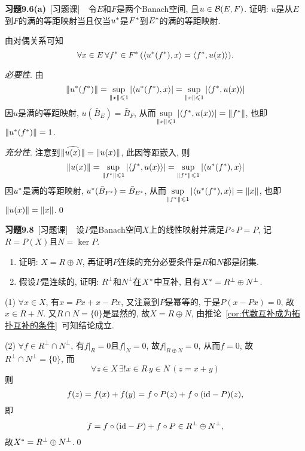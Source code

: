     \textbf{习题9.6(a)}\ [习题课]\ \ 令$ E $和$ F $是两个Banach空间, 且$ u\in\mathcal{B}(E,F) $. 证明: $ u $是从$ E $到$ F $的满的等距映射当且仅当$ u^{*} $是$ F^{*} $到$ E^{*} $的满的等距映射.
    \begin{Proof}
    由对偶关系可知
    \[
    \forall x\in E\,\forall f^{*}\in F^{*}\,(\left\langle u^{*}(f^{*}),x \right\rangle=\left\langle f^{*},u(x) \right\rangle).
    \]

    \textsl{必要性}. 由
    \[
    \left\| u^{*}(f^{*}) \right\|=\sup_{\left\| x \right\|\leqslant 1}\left| \left\langle u^{*}(f^{*}),x \right\rangle \right| =\sup_{\left\| x \right\|\leqslant 1}\left| \left\langle f^{*},u(x) \right\rangle \right| 
    \]
    因$ u $是满的等距映射, $ u(\bar{B}_E)=\bar{B}_F $, 从而$ \sup\limits_{\left\| x \right\|\leqslant 1}\left| \left\langle f^{*},u(x) \right\rangle \right| =\left\| f^{*} \right\| $, 也即$ \left\| u^{*}(f^{*}) \right\|=1 $.

    \textsl{充分性}. 注意到$ \lVert \widehat{u(x)}\rVert=\left\| u(x) \right\| $, 此因等距嵌入, 则
    \[
    \left\| u(x) \right\|=\sup_{\left\| f^{*} \right\|\leqslant 1}\left| \left\langle f^{*},u(x) \right\rangle \right| =\sup_{\left\| f^{*} \right\|\leqslant 1}\left| \left\langle u^{*}(f^{*}),x \right\rangle \right| 
    \]
    因$ u^{*} $是满的等距映射, $ u^{*}(\bar{B}_{F^{*}})=\bar{B}_{E^{*}} $, 从而$ \sup\limits_{\left\| f^{*} \right\|\leqslant 1}\left| \left\langle u^{*}(f^{*}),x \right\rangle \right| =\left\| x \right\| $, 也即$ \left\| u(x) \right\|=\left\| x \right\| $.\qed
    \end{Proof}

    \textbf{习题9.8}\ [习题课]\ \ 设$ P $是Banach空间$ X $上的线性映射并满足$ P\circ P=P $, 记$ R=P(X) $且$ N=\ker P $.
    \begin{enumerate}[(1)]
    \item 证明: $ X=R\oplus N $, 再证明$ P $连续的充分必要条件是$ R $和$ N $都是闭集.
    \item 假设$ P $是连续的, 证明: $ R^\bot $和$ N^\bot $在$ X^{*} $中互补, 且有$ X^{*}=R^\bot\oplus N^\bot $.
    \end{enumerate}
    \begin{Proof}
    (1) $ \forall x\in X $, 有$ x=Px+x-Px $, 又注意到$ P $是幂等的, 于是$ P(x-Px)=0 $, 故$ x\in R+N $. 又$ R\cap N=\{0\} $是显然的, 故$ X=R\oplus N $, 由推论~\ref{cor:代数互补成为拓扑互补的条件}~可知结论成立.

    (2) $ \forall f\in R^\bot\cap N^\bot $, 有$ f|_R=0 $且$ f|_N=0 $, 故$ f|_{R\oplus N}=0 $, 从而$ f=0 $, 故$ R^\bot\cap N^\bot =\{0\} $, 而
    \[
    \forall z\in X\,\exists!x\in R\,y\in N\,(z=x+y)
    \]
    则
    \[
    f(z)=f(x)+f(y)=f\circ P(z)+f\circ(\mathrm{id}-P)(z),
    \]
    即
    \[
    f=f\circ(\mathrm{id}-P)+f\circ P\in R^\bot\oplus N^\bot,
    \]
    故$ X^{*}=R^\bot\oplus N^\bot $.\qed
    \end{Proof}

